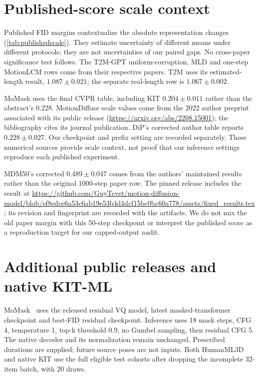 \section{Published-score scale context}

Published FID margins contextualize the absolute representation changes (\cref{tab:publishedscale}). They estimate uncertainty of different means under different protocols; they are not uncertainties of our paired gaps. No cross-paper significance test follows. The T2M-GPT uniform-corruption, MLD and one-step MotionLCM rows come from their respective papers. T2M uses its estimated-length result, $1.087\pm0.021$; the separate real-length row is $1.067\pm0.002$.

MoMask uses the final CVPR table, including KIT $0.204\pm0.011$ rather than the abstract's 0.228. MotionDiffuse scale values come from the 2022 author preprint associated with its public release (\url{https://arxiv.org/abs/2208.15001}); the bibliography cites its journal publication. DiP's corrected author table reports $0.228\pm0.027$. Our checkpoint and prefix setting are recorded separately. These numerical sources provide scale context, not proof that our inference settings reproduce each published experiment.

MDM50's corrected $0.489\pm0.047$ comes from the authors' maintained results rather than the original 1000-step paper row. The pinned release includes the result at \url{https://github.com/GuyTevet/motion-diffusion-model/blob/ef8edce6a53c6ab19e53b4d4dcf15bc0bc60a778/assets/fixed_results.tex}; its revision and fingerprint are recorded with the artifacts. We do not mix the old paper margin with this 50-step checkpoint or interpret the published score as a reproduction target for our capped-output audit.

\section{Additional public releases and native KIT-ML}

MoMask~\cite{momask2024} uses the released residual VQ model, latest masked-transformer checkpoint and best-FID residual checkpoint. Inference uses 18 mask steps, CFG 4, temperature 1, top-k threshold 0.9, no Gumbel sampling, then residual CFG 5. The native decoder and its normalization remain unchanged. Prescribed durations are supplied; future source poses are not inputs. Both HumanML3D and native KIT use the full eligible test cohorts after dropping the incomplete 32-item batch, with 20 draws.

